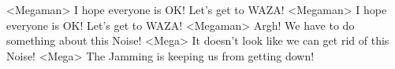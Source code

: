 <Megaman> I hope everyone is OK! Let's get to WAZA! 
<Megaman> I hope everyone is OK! Let's get to WAZA! 
<Megaman> Argh! We have to do something about this Noise! 
<Mega> It doesn't look like we can get rid of this Noise! 
<Mega> The Jamming is keeping us from getting down! 
